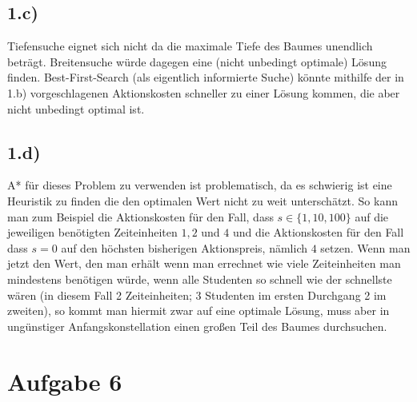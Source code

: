 \documentclass[a4paper]{article}
\begin{document}
\subsection*{1.c)}
Tiefensuche eignet sich nicht da die maximale Tiefe des Baumes unendlich beträgt. Breitensuche würde dagegen eine (nicht unbedingt optimale) Lösung finden. Best-First-Search (als eigentlich informierte Suche) könnte mithilfe der in 1.b) vorgeschlagenen Aktionskosten schneller zu einer Lösung kommen, die aber nicht unbedingt optimal ist.

\subsection*{1.d)}
A* für dieses Problem zu verwenden ist problematisch, da es schwierig ist eine Heuristik zu finden die den optimalen Wert nicht zu weit unterschätzt. So kann man zum Beispiel die Aktionskosten für den Fall, dass $s \in \{1,10,100\}$ auf die jeweiligen benötigten Zeiteinheiten $1, 2$ und $4$ und die Aktionskosten für den Fall dass $s=0$ auf den höchsten bisherigen Aktionspreis, nämlich $4$ setzen. Wenn man jetzt den Wert, den man erhält wenn man errechnet wie viele Zeiteinheiten man mindestens benötigen würde, wenn alle Studenten so schnell wie der schnellste wären (in diesem Fall 2 Zeiteinheiten; 3 Studenten im ersten Durchgang 2 im zweiten), so kommt man hiermit zwar auf eine optimale Lösung, muss aber in ungünstiger Anfangskonstellation einen großen Teil des Baumes durchsuchen.

\section*{Aufgabe 6}
\end{document}

